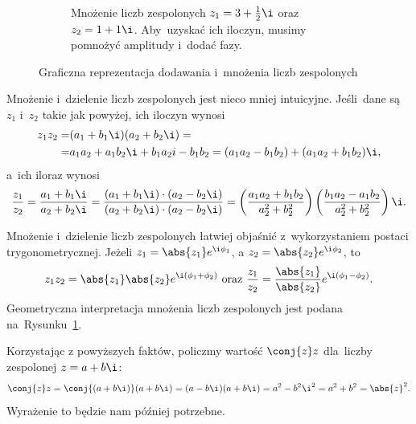 \begin{figure}
\begin{subfigure}{0.46\textwidth}
{{
			}
		}
		\caption{Mnożenie liczb zespolonych $z_1 = 3 + \frac{1}{2}\i$ oraz~$z_2 = 1 + 1\i$. Aby~uzyskać ich iloczyn, musimy pomnożyć amplitudy i~dodać fazy.}
		\label{rys:mnożeniezespolonych}
	\end{subfigure}
	\caption{Graficzna reprezentacja dodawania i~mnożenia liczb zespolonych}
	\label{rys:dodawanieimnożeniezespolonych}
\end{figure}

Mnożenie i~dzielenie liczb zespolonych jest nieco mniej intuicyjne. Jeśli~dane
są $z_1$ i~$z_2$ takie jak powyżej, ich iloczyn wynosi
\begin{equation*}
	\begin{split}
		z_1 z_2 =&(a_1+b_1 \i) (a_2 + b_2 \i)=
		\\=&a_1 a_2 + a_1 b_2 \i + b_1 a_2 i - b_1 b_2 = (a_1 a_2 - b_1 b_2) + (a_1 a_2 + b_1 b_2)\i,
	\end{split}
\end{equation*}
a~ich iloraz wynosi
$$ \frac{z_1}{z_2} =
	\frac{a_1 + b_1\i}{a_2 +b_2\i} =
	\frac{\left(a_1 + b_1\i\right) \cdot \left(a_2 - b_2\i\right)}
	{\left (a_2 + b_2\i\right) \cdot \left (a_2 - b_2\i\right)} =
	\left({a_1a_2 + b_1b_2 \over a_2^2 + b_2^2}\right) \left( {b_1a_2 - a_1b_2 \over a_2^2 + b_2^2} \right)\i.
$$

Mnożenie i~dzielenie liczb zespolonych łatwiej objaśnić z~wykorzystaniem postaci
trygonometrycznej. Jeżeli
$z_1 = \abs{z_1}e^{\i \phi_1}$, a $z_2 = \abs{z_2}e^{\i \phi_2}$, to
$$
	z_1 z_2 = \abs{z_1} \abs{z_2} e^{\i (\phi_1+\phi_2)}
	\text{ oraz } \frac{z_1}{z_2} = \frac{\abs{z_1}}{\abs{z_2}} e^{\i (\phi_1 - \phi_2)}.
$$
Geometryczna interpretacja mnożenia
liczb zespolonych jest podana na~Rysunku~\ref{rys:mnożeniezespolonych}.

Korzystając z powyższych faktów, policzmy wartość $\conj{z}z$
dla~liczby zespolonej $z=a+b\i$:
$$\conj{z}z = \conj{(a+b\i)}(a+b\i) =
	(a-b\i)(a+b\i) = a^2 - b^2\i^2 = a^2+b^2 = \abs{z}^2.$$
Wyrażenie to będzie nam później potrzebne.

